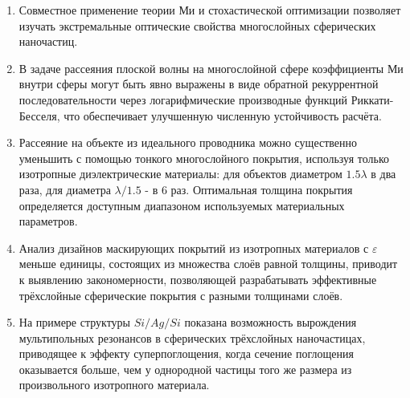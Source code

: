 {}  %
\mynobreakpar\begin{enumerate}
  \item Совместное применение теории Ми и стохастической оптимизации
    позволяет изучать экстремальные оптические свойства многослойных
    сферических наночастиц.
  \item В задаче рассеяния плоской волны на многослойной сфере
    коэффициенты Ми внутри сферы могут быть явно выражены в виде
    обратной рекуррентной последовательности через логарифмические
    производные функций Риккати-Бесселя, что обеспечивает улучшенную
    численную устойчивость расчёта. %
  \item Рассеяние на объекте из идеального проводника можно
    существенно уменьшить с помощью тонкого многослойного покрытия,
    используя только изотропные диэлектрические материалы: для
    объектов диаметром $1.5\lambda$ в два раза, для диаметра
    $\lambda/1.5$ - в 6 раз. Оптимальная толщина покрытия определяется
    доступным диапазоном используемых материальных параметров.
  \item %
    Анализ дизайнов маскирующих покрытий из изотропных материалов с
    $\varepsilon$ меньше единицы, состоящих из множества слоёв равной
    толщины, приводит к выявлению закономерности, позволяющей
    разрабатывать эффективные трёхслойные сферические покрытия с
    разными толщинами слоёв. %

  \item На примере структуры $Si/Ag/Si$ показана возможность
    вырождения мультипольных резонансов в сферических трёхслойных
    наночастицах, приводящее к эффекту суперпоглощения, когда сечение
    поглощения оказывается больше, чем у однородной частицы того же
    размера из произвольного изотропного материала.
\end{enumerate}


